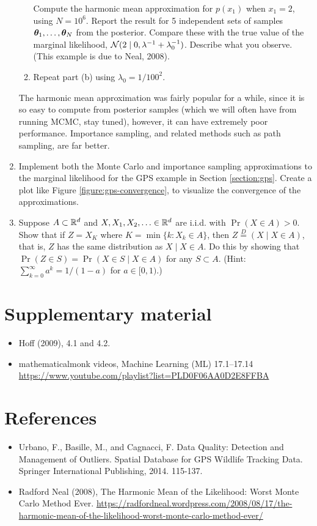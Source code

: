 \documentclass[12pt]{article}
\begin{document}
\begin{enumerate}
\begin{enumerate}
    Compute the harmonic mean approximation for $p(x_1)$ when $x_1=2$, using $N=10^6$.
    Report the result for 5 independent sets of samples ${\bm\theta}_1,\ldots,{\bm\theta}_N$ from the posterior.  
    Compare these with the true value of the marginal likelihood, $\mathcal{N}(2\mid 0,\lambda^{-1}+\lambda_0^{-1})$.  Describe what you observe.
    (This example is due to Neal, 2008).
\item Repeat part (b) using $\lambda_0 = 1/100^2$.
\end{enumerate}
The harmonic mean approximation was fairly popular for a while, since it is so easy to compute from posterior samples (which we will often have from running MCMC, stay tuned), however, it can have extremely poor performance. Importance sampling, and related methods such as path sampling, are far better.
\item Implement both the Monte Carlo and importance sampling approximations to the marginal likelihood for the GPS example in Section \ref{section:gps}. Create a plot like Figure \ref{figure:gps-convergence}, to visualize the convergence of the approximations.
\item Suppose $A\subset\mathbb{R}^d$ and $X,X_1,X_2,\dotsc\in\mathbb{R}^d$ are i.i.d. with $\Pr(X\in A)>0$. Show that if $Z = X_K$ where $K =\min\{k: X_k\in A\}$, then $Z \overset{D}{=} (X\mid X\in A)$, that is, $Z$ has the same distribution as $X\mid X\in A$. Do this by showing that $\Pr(Z\in S) = \Pr(X\in S\mid X\in A)$ for any $S\subset A$. (Hint: $\sum_{k = 0}^\infty a^k = 1/(1-a)$ for $a\in[0,1)$.)
\end{enumerate}







\section*{Supplementary material}
\begin{itemize}
\item Hoff (2009), 4.1 and 4.2.
\item mathematicalmonk videos, Machine Learning (ML) 17.1--17.14 \\ 
    \url{https://www.youtube.com/playlist?list=PLD0F06AA0D2E8FFBA}
\end{itemize}

\section*{References}
\begin{itemize}
\item Urbano, F., Basille, M., and Cagnacci, F. Data Quality: Detection and Management of Outliers. Spatial Database for GPS Wildlife Tracking Data. Springer International Publishing, 2014. 115-137.
\item Radford Neal (2008), The Harmonic Mean of the Likelihood: Worst Monte Carlo Method Ever. 
\url{https://radfordneal.wordpress.com/2008/08/17/the-harmonic-mean-of-the-likelihood-worst-monte-carlo-method-ever/}
\end{itemize}
\end{document}
